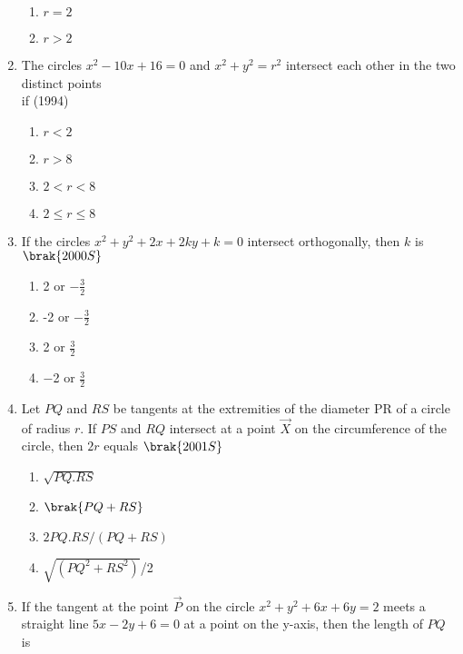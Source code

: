 \begin{enumerate}
\begin{multicols}{2}
\begin{enumerate}
    	\item $r=2$
    	\item $r>2$
    \end{enumerate}
\end{multicols}
    \item The circles $x^{2}-10x+16=0$ and $x^{2}+y^{2}=r^{2}$ intersect each other in the two distinct points\\ if
    \hfill {(1994)}
    \begin{multicols}{2}
\begin{enumerate}
    	\item $r<2$
    	\item $r>8$
    	\item $2<r<8$
    	\item $2\leq r\leq8$
    \end{enumerate}
\end{multicols}
     \item If the circles $x^2+y^2+2x+2ky+k=0$ intersect orthogonally, then $k$ is
        \hfill$\brak{2000S}$
    \begin{multicols}{2}
\begin{enumerate}
        \item 2 or $-\frac{3}{2}$
        \item -2 or $-\frac{3}{2}$
        \item 2 or $\frac{3}{2}$
        \item $-$2 or $\frac{3}{2}$
    \end{enumerate}
    \end{multicols}
        \item Let $PQ$ and $RS$ be tangents at the extremities of the diameter PR of a circle of radius $r$. If $PS$ and $RQ$ intersect at a point $\vec{X}$ on the circumference of the circle,  then $2r$ equals
        \hfill$\brak{2001S}$
        \begin{multicols}{2}
\begin{enumerate}
    \item $\sqrt{PQ.RS}$
     \item $\brak{PQ+RS}$
    \item $2PQ.RS/(PQ+RS)$
     \item {$\sqrt{(PQ^2+RS^2)}$}/2
     \end{enumerate}
\end{multicols}
     \item If the tangent at the point $\vec{P}$ on the circle $x^2+y^2+6x+6y=2$ meets a straight line $5x-2y+6=0$ at a point on the y-axis,  then the length of $PQ$ is 

\end{enumerate}
